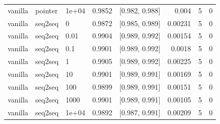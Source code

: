 \documentclass[10pt]{article}
\begin{document}
{\begin{longtable}{lllrlrrr}
vanilla & pointer & 1e+04 & 0.9852 & [0.982, 0.988] & 0.004 & 5 & 0\\
vanilla & seq2seq & 0 & 0.9872 & [0.985, 0.989] & 0.00231 & 5 & 0\\
vanilla & seq2seq & 0.01 & 0.9904 & [0.989, 0.992] & 0.00154 & 5 & 0\\
vanilla & seq2seq & 0.1 & 0.9901 & [0.989, 0.992] & 0.0018 & 5 & 0\\
vanilla & seq2seq & 1 & 0.9905 & [0.989, 0.992] & 0.00225 & 5 & 0\\
vanilla & seq2seq & 10 & 0.9901 & [0.989, 0.991] & 0.00169 & 5 & 0\\
vanilla & seq2seq & 100 & 0.9899 & [0.989, 0.991] & 0.00151 & 5 & 0\\
vanilla & seq2seq & 1000 & 0.9901 & [0.989, 0.991] & 0.00105 & 5 & 0\\
vanilla & seq2seq & 1e+04 & 0.9892 & [0.987, 0.991] & 0.00209 & 5 & 0\\
\bottomrule
\end{longtable}
}
\end{document}
